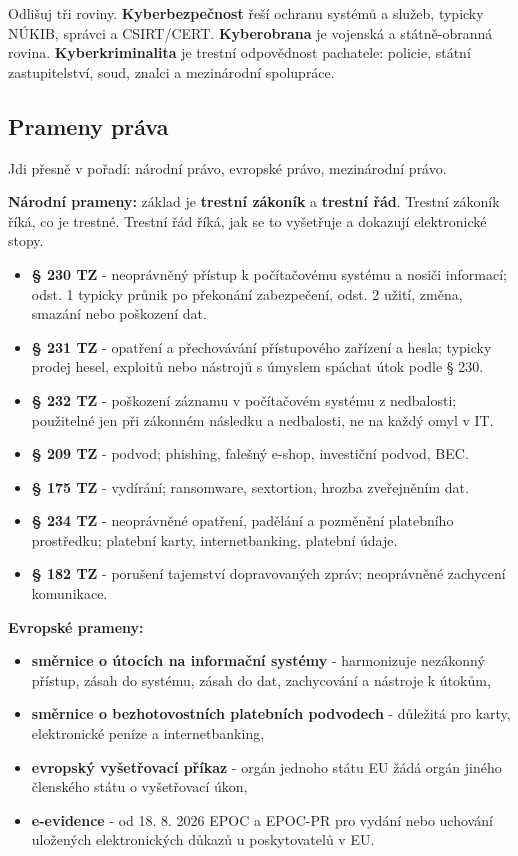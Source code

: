 Odlišuj tři roviny. \textbf{Kyberbezpečnost} řeší ochranu systémů a služeb, typicky NÚKIB, správci a CSIRT/CERT. \textbf{Kyberobrana} je vojenská a státně-obranná rovina. \textbf{Kyberkriminalita} je trestní odpovědnost pachatele: policie, státní zastupitelství, soud, znalci a mezinárodní spolupráce.


\subsection*{Prameny práva}
Jdi přesně v pořadí: národní právo, evropské právo, mezinárodní právo.

\textbf{Národní prameny:} základ je \textbf{trestní zákoník} a \textbf{trestní řád}. Trestní zákoník říká, co je trestné. Trestní řád říká, jak se to vyšetřuje a dokazují elektronické stopy.
\begin{itemize}
  \item \textbf{§ 230 TZ} - neoprávněný přístup k počítačovému systému a nosiči informací; odst. 1 typicky průnik po překonání zabezpečení, odst. 2 užití, změna, smazání nebo poškození dat.
  \item \textbf{§ 231 TZ} - opatření a přechovávání přístupového zařízení a hesla; typicky prodej hesel, exploitů nebo nástrojů s úmyslem spáchat útok podle § 230.
  \item \textbf{§ 232 TZ} - poškození záznamu v počítačovém systému z nedbalosti; použitelné jen při zákonném následku a nedbalosti, ne na každý omyl v IT.
  \item \textbf{§ 209 TZ} - podvod; phishing, falešný e-shop, investiční podvod, BEC.
  \item \textbf{§ 175 TZ} - vydírání; ransomware, sextortion, hrozba zveřejněním dat.
  \item \textbf{§ 234 TZ} - neoprávněné opatření, padělání a pozměnění platebního prostředku; platební karty, internetbanking, platební údaje.
  \item \textbf{§ 182 TZ} - porušení tajemství dopravovaných zpráv; neoprávněné zachycení komunikace.
\end{itemize}

\textbf{Evropské prameny:}
\begin{itemize}
  \item \textbf{směrnice o útocích na informační systémy} - harmonizuje nezákonný přístup, zásah do systému, zásah do dat, zachycování a nástroje k útokům,
  \item \textbf{směrnice o bezhotovostních platebních podvodech} - důležitá pro karty, elektronické peníze a internetbanking,
  \item \textbf{evropský vyšetřovací příkaz} - orgán jednoho státu EU žádá orgán jiného členského státu o vyšetřovací úkon,
  \item \textbf{e-evidence} - od 18. 8. 2026 EPOC a EPOC-PR pro vydání nebo uchování uložených elektronických důkazů u poskytovatelů v EU.
\end{itemize}

